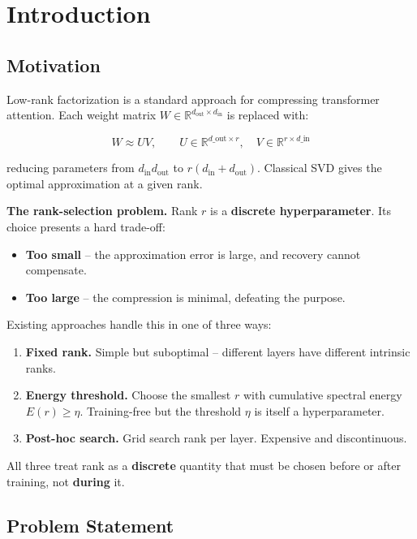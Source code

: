 
\section{Introduction}

\subsection{Motivation}

Low-rank factorization is a standard approach for compressing transformer 
attention. Each weight matrix $W \in \mathbb{R}^{d_\text{out} \times d_\text{in}}$ 
is replaced with:

\[
W \approx U V, \qquad
U \in \mathbb{R}^{d\_\text{out} \times r}, \quad
V \in \mathbb{R}^{r \times d\_\text{in}}
\tag{1.1}
\]

reducing parameters from $d_\text{in} d_\text{out}$ to $r(d_\text{in} + d_\text{out})$. 
Classical SVD gives the optimal approximation at a given rank.

\textbf{The rank-selection problem.} Rank $r$ is a \textbf{discrete hyperparameter}. 
Its choice presents a hard trade-off:

\begin{itemize}
\item \textbf{Too small} -- the approximation error is large, and recovery cannot
  compensate.
\item \textbf{Too large} -- the compression is minimal, defeating the purpose.

\end{itemize}
Existing approaches handle this in one of three ways:

\begin{enumerate}
\item \textbf{Fixed rank.} Simple but suboptimal -- different layers have different
  intrinsic ranks.
\item \textbf{Energy threshold.} Choose the smallest $r$ with cumulative spectral
  energy $E(r) \geq \eta$. Training-free but the threshold $\eta$ is
  itself a hyperparameter.
\item \textbf{Post-hoc search.} Grid search rank per layer. Expensive and
  discontinuous.

\end{enumerate}
All three treat rank as a \textbf{discrete} quantity that must be chosen before 
or after training, not \textbf{during} it.

\subsection{Problem Statement}


